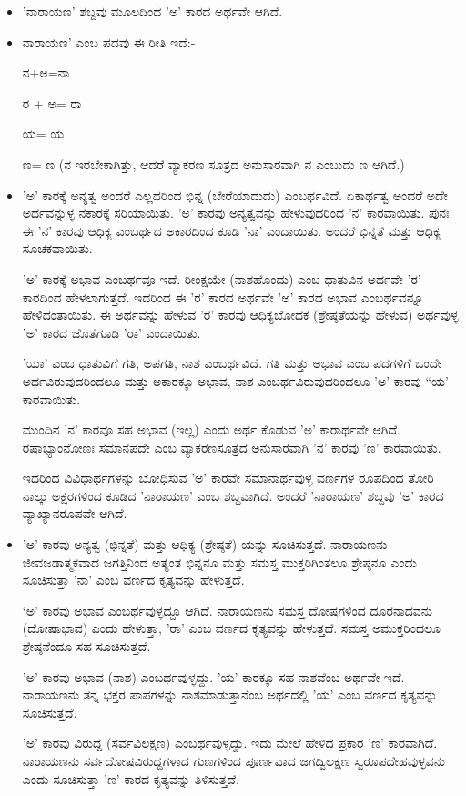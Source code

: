 \begin{itemize}
\item 'ನಾರಾಯಣ' ಶಬ್ದವು ಮೂಲದಿಂದ 'ಅ' ಕಾರದ ಅರ್ಥವೇ ಆಗಿದೆ.

 \item 
 ನಾರಾಯಣ' ಎಂಬ ಪದವು ಈ ರೀತಿ ಇದೆ:-

 ನ+ಅ=ನಾ

 ರ + ಅ= ರಾ

 ಯ= ಯ

 ಣ= ಣ (ನ ಇರಬೇಕಾಗಿತ್ತು, ಆದರೆ ವ್ಯಾಕರಣ ಸೂತ್ರದ ಅನುಸಾರವಾಗಿ ನ ಎಂಬುದು ಣ ಆಗಿದೆ.)

 \item 
 'ಅ' ಕಾರಕ್ಕೆ ಅನ್ಯತ್ವ ಅಂದರೆ ಎಲ್ಲದರಿಂದ ಭಿನ್ನ (ಬೇರೆಯಾದುದು) ಎಂಬರ್ಥವಿದೆ. ಏಕಾರ್ಥತ್ವ ಅಂದರೆ ಅದೇ ಅರ್ಥವನ್ನುಳ್ಳ ನಕಾರಕ್ಕೆ ಸರಿಯಾಯಿತು. 'ಅ' ಕಾರವು ಅನ್ಯತ್ವವನ್ನು ಹೇಳುವುದರಿಂದ 'ನ' ಕಾರವಾಯಿತು. ಪುನಃ ಈ 'ನ' ಕಾರವು ಆಧಿಕ್ಯ ಎಂಬರ್ಥದ ಅಕಾರದಿಂದ ಕೂಡಿ 'ನಾ' ಎಂದಾಯಿತು. ಅಂದರೆ ಭಿನ್ನತೆ ಮತ್ತು ಆಧಿಕ್ಯ ಸೂಚಕವಾಯಿತು.

 'ಅ' ಕಾರಕ್ಕೆ ಅಭಾವ ಎಂಬರ್ಥವೂ ಇದೆ. ರೀಂಕ್ಷಯೇ (ನಾಶಹೊಂದು) ಎಂಬ ಧಾತುವಿನ ಅರ್ಥವೇ 'ರ' ಕಾರದಿಂದ ಹೇಳಲಾಗುತ್ತದೆ. ಇದರಿಂದ ಈ 'ರ' ಕಾರದ ಅರ್ಥವೇ 'ಅ' ಕಾರದ ಅಭಾವ ಎಂಬರ್ಥವನ್ನೂ ಹೇಳಿದಂತಾಯಿತು. ಈ ಅರ್ಥವನ್ನು ಹೇಳುವ 'ರ' ಕಾರವು ಆಧಿಕ್ಯಬೋಧಕ (ಶ್ರೇಷ್ಠತೆಯನ್ನು ಹೇಳುವ) ಅರ್ಥವುಳ್ಳ 'ಅ' ಕಾರದ ಜೊತೆಗೂಡಿ 'ರಾ' ಎಂದಾಯಿತು.

 'ಯಾ' ಎಂಬ ಧಾತುವಿಗೆ ಗತಿ, ಅಪಗತಿ, ನಾಶ ಎಂಬರ್ಥವಿದೆ. ಗತಿ ಮತ್ತು ಅಭಾವ ಎಂಬ ಪದಗಳಿಗೆ ಒಂದೇ ಅರ್ಥವಿರುವುದರಿಂದಲೂ ಮತ್ತು ಅಕಾರಕ್ಕೂ ಅಭಾವ, ನಾಶ ಎಂಬರ್ಥವಿರುವುದರಿಂದಲೂ 'ಅ' ಕಾರವು “ಯ' ಕಾರವಾಯಿತು.

 ಮುಂದಿನ 'ನ' ಕಾರವೂ ಸಹ ಅಭಾವ (ಇಲ್ಲ) ಎಂದು ಅರ್ಥ ಕೊಡುವ 'ಅ' ಕಾರಾರ್ಥವೇ ಆಗಿದೆ. ರಷಾಭ್ಯಾಂನೋಣಃ ಸಮಾನಪದೇ ಎಂಬ ವ್ಯಾಕರಣಸೂತ್ರದ ಅನುಸಾರವಾಗಿ 'ನ' ಕಾರವು 'ಣ' ಕಾರವಾಯಿತು.

 ಇದರಿಂದ ವಿವಿಧಾರ್ಥಗಳನ್ನು ಬೋಧಿಸುವ 'ಅ' ಕಾರವೇ ಸಮಾನಾರ್ಥವುಳ್ಳ ವರ್ಣಗಳ ರೂಪದಿಂದ ತೋರಿ ನಾಲ್ಕು ಅಕ್ಷರಗಳಿಂದ ಕೂಡಿದ 'ನಾರಾಯಣ' ಎಂಬ ಶಬ್ದವಾಗಿದೆ. ಅಂದರೆ 'ನಾರಾಯಣ' ಶಬ್ದವು 'ಅ' ಕಾರದ ವ್ಯಾಖ್ಯಾನರೂಪವೇ ಆಗಿದೆ.

 \item 
 'ಅ' ಕಾರವು ಅನ್ಯತ್ವ (ಭಿನ್ನತೆ) ಮತ್ತು ಆಧಿಕ್ಯ (ಶ್ರೇಷ್ಠತೆ) ಯನ್ನು ಸೂಚಿಸುತ್ತದೆ. ನಾರಾಯಣನು ಜೀವಜಡಾತ್ಮಕವಾದ ಜಗತ್ತಿನಿಂದ ಅತ್ಯಂತ ಭಿನ್ನನೂ ಮತ್ತು ಸಮಸ್ತ ಮುಕ್ತರಿಗಿಂತಲೂ ಶ್ರೇಷ್ಠನೂ ಎಂದು ಸೂಚಿಸುತ್ತಾ 'ನಾ' ಎಂಬ ವರ್ಣದ ಕೃತ್ಯವನ್ನು ಹೇಳುತ್ತದೆ.

 `ಅ' ಕಾರವು ಅಭಾವ ಎಂಬರ್ಥವುಳ್ಳದ್ದೂ ಆಗಿದೆ. ನಾರಾಯಣನು ಸಮಸ್ತ ದೋಷಗಳಿಂದ ದೂರನಾದವನು (ದೋಷಾಭಾವ) ಎಂದು ಹೇಳುತ್ತಾ, 'ರಾ' ಎಂಬ ವರ್ಣದ ಕೃತ್ಯವನ್ನು ಹೇಳುತ್ತದೆ. ಸಮಸ್ತ ಅಮುಕ್ತರಿಂದಲೂ ಶ್ರೇಷ್ಠನೆಂದೂ ಸಹ ಸೂಚಿಸುತ್ತದೆ. 

 'ಅ' ಕಾರವು ಅಭಾವ (ನಾಶ) ಎಂಬರ್ಥವುಳ್ಳದ್ದು. 'ಯ' ಕಾರಕ್ಕೂ ಸಹ ನಾಶವೆಂಬ ಅರ್ಥವೇ ಇದೆ. ನಾರಾಯಣನು ತನ್ನ ಭಕ್ತರ ಪಾಪಗಳನ್ನು ನಾಶಮಾಡುತ್ತಾನೆಂಬ ಅರ್ಥದಲ್ಲಿ 'ಯ' ಎಂಬ ವರ್ಣದ ಕೃತ್ಯವನ್ನು ಸೂಚಿಸುತ್ತದೆ. 

 'ಅ' ಕಾರವು ವಿರುದ್ದ (ಸರ್ವವಿಲಕ್ಷಣ) ಎಂಬರ್ಥವುಳ್ಳದ್ದು. ಇದು ಮೇಲೆ ಹೇಳಿದ ಪ್ರಕಾರ 'ಣ' ಕಾರವಾಗಿದೆ. ನಾರಾಯಣನು ಸರ್ವದೋಷವಿರುದ್ದಗಳಾದ ಗುಣಗಳಿಂದ ಪೂರ್ಣವಾದ ಜಗದ್ವಿಲಕ್ಷಣ ಸ್ವರೂಪದೇಹವುಳ್ಳವನು ಎಂದು ಸೂಚಿಸುತ್ತಾ 'ಣ' ಕಾರದ ಕೃತ್ಯವನ್ನು ತಿಳಿಸುತ್ತದೆ.

\end{itemize}

